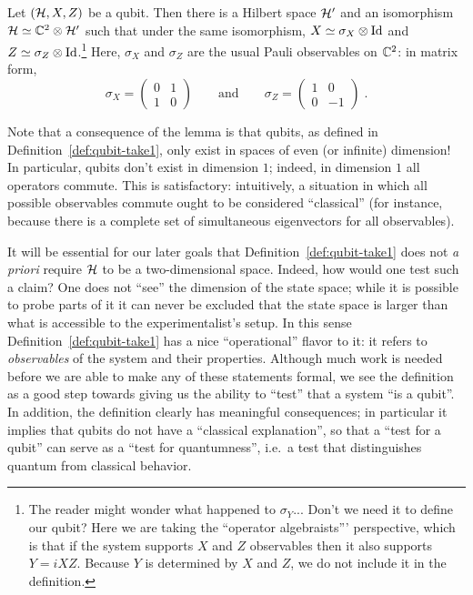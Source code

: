 \begin{lemma}\label{lem:qubit-c2}
Let $(\mathcal{H},X,Z)$ be a qubit. Then there is a Hilbert space $\mathcal{H}'$ and an isomorphism $\mathcal{H}\simeq \mathbb{C}^2 \otimes \mathcal{H}'$ such that under the same isomorphism, $X\simeq \sigma_X\otimes \mathop{\rm Id}\nolimits$ and $Z\simeq \sigma_Z \otimes \mathop{\rm Id}\nolimits$.\footnote{The reader might wonder what happened to $\sigma_Y$... Don't we need it to define our qubit? Here we are taking the ``operator algebraists''' perspective, which is that if the system supports $X$ and $Z$ observables then it also supports $Y=iXZ$. Because $Y$ is determined by $X$ and $Z$, we do not include it in the definition.} Here, $\sigma_X$ and $\sigma_Z$ are the usual Pauli observables on $\mathbb{C}^2$: in matrix form, 
\[ \sigma_X = \begin{pmatrix} 0 & 1 \\ 1 & 0 \end{pmatrix} \qquad\text{and}\qquad\sigma_Z = \begin{pmatrix} 1 & 0 \\ 0 & -1 \end{pmatrix}\;.\]
\end{lemma}

Note that a consequence of the lemma is that qubits, as defined in Definition~\ref{def:qubit-take1}, only exist in spaces of even (or infinite) dimension! In particular, qubits don't exist in dimension $1$; indeed, in dimension $1$ all operators commute. This is satisfactory: intuitively, a situation in which all possible observables commute ought to be considered ``classical'' (for instance, because there is a complete set of simultaneous eigenvectors for all observables). 

It will be essential for our later goals that Definition~\ref{def:qubit-take1} does not \emph{a priori} require $\mathcal{H}$ to be a two-dimensional space. Indeed, how would one test such a claim? One does not ``see'' the dimension of the state space; while it is possible to probe parts of it it can never be excluded that the state space is larger than what is accessible to the experimentalist's setup. In this sense Definition~\ref{def:qubit-take1} has a nice ``operational'' flavor to it: it refers to \emph{observables} of the system and their properties.  Although much work is needed before we are able to make any of these statements formal, we see the definition as a good step towards giving us the ability to ``test'' that a system ``is a qubit''. In addition, the definition clearly has meaningful consequences; in particular it implies that qubits do not have a ``classical explanation'', so that a ``test for a qubit'' can serve as a ``test for quantumness'', i.e.\ a test that distinguishes quantum from classical behavior. 

